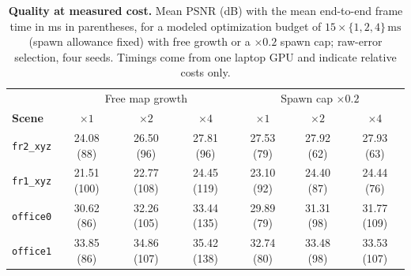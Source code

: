\begin{table}[t]
\centering
\footnotesize\setlength{\tabcolsep}{4pt}
\begin{tabular}{lcccccc}
\toprule
& \multicolumn{3}{c}{Free map growth} & \multicolumn{3}{c}{Spawn cap $\times0.2$} \\
\textbf{Scene} & $\times1$ & $\times2$ & $\times4$ & $\times1$ & $\times2$ & $\times4$ \\
\midrule
\texttt{fr2\_xyz} & 24.08 (88) & 26.50 (96) & 27.81 (96) & 27.53 (79) & 27.92 (62) & 27.93 (63) \\
\texttt{fr1\_xyz} & 21.51 (100) & 22.77 (108) & 24.45 (119) & 23.10 (92) & 24.40 (87) & 24.44 (76) \\
\texttt{office0} & 30.62 (86) & 32.26 (105) & 33.44 (135) & 29.89 (79) & 31.31 (98) & 31.77 (109) \\
\texttt{office1} & 33.85 (86) & 34.86 (107) & 35.42 (138) & 32.74 (80) & 33.48 (98) & 33.53 (107) \\
\bottomrule
\end{tabular}
\caption{\textbf{Quality at measured cost.} Mean PSNR (dB) with the mean end-to-end frame time in ms in parentheses, for a modeled optimization budget of $15\times\{1,2,4\}\,\mathrm{ms}$ (spawn allowance fixed) with free growth or a $\times0.2$ spawn cap; raw-error selection, four seeds. Timings come from one laptop GPU and indicate relative costs only.}
\label{tab:compute}
\end{table}

